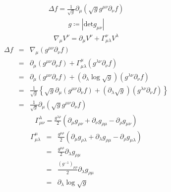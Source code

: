 \documentclass[12pt]{ujarticle}
\begin{document}
\begin{eqnarray}
\Delta f  = \frac{1}{\sqrt{g}}\partial_{\mu}\left(\sqrt{g}g^{\mu\nu}\partial_{\nu}f\right)
\end{eqnarray}
\begin{eqnarray}
g \coloneqq \left|\mathrm{det}g_{\mu\nu}\right|
\end{eqnarray}
\begin{eqnarray}
\nabla_{\mu}V^{\nu} = \partial_{\mu}V^{\nu} + \Gamma^{\nu}_{\mu\lambda}V^{\lambda}
\end{eqnarray}
\begin{eqnarray}
\Delta f &=& \nabla_{\mu}\left(g^{\mu\nu}\partial_{\nu}f\right) \\
&=& \partial_{\mu}\left(g^{\mu\nu}\partial_{\nu}f\right) + \Gamma^{\mu}_{\mu\lambda}\left(g^{\lambda\nu}\partial_{\nu}f\right) \\
&=& \partial_{\mu}\left(g^{\mu\nu}\partial_{\nu}f\right) + \left(\partial_{\lambda}\log\sqrt{g}\right)\left(g^{\lambda\nu}\partial_{\nu}f\right) \\
&=& \frac{1}{\sqrt{g}}\left\{\sqrt{g}\partial_{\mu}\left(g^{\mu\nu}\partial_{\nu}f\right) + \left(\partial_{\lambda}\sqrt{g}\right)\left(g^{\lambda\nu}\partial_{\nu}f\right)\right\} \\
&=& \frac{1}{\sqrt{g}}\partial_{\mu}\left(\sqrt{g}g^{\mu\nu}\partial_{\nu}f\right)
\end{eqnarray}
\begin{eqnarray}
\Gamma^{\lambda}_{\mu\nu} = \frac{g^{\lambda\rho}}{2}\left(\partial_{\mu}g_{\rho\nu} + \partial_{\nu}g_{\rho\mu} - \partial_{\rho}g_{\mu\nu}\right)
\end{eqnarray}
\begin{eqnarray}
\Gamma^{\mu}_{\mu\lambda} &=& \frac{g^{\mu\rho}}{2}\left(\partial_{\mu}g_{\rho\lambda} + \partial_{\lambda}g_{\rho\mu} - \partial_{\rho}g_{\mu\lambda}\right) \\
&=& \frac{g^{\mu\rho}}{2}\partial_{\lambda}g_{\rho\mu} \\
&=& \frac{\left(g^{-1}\right)_{\mu\rho}}{2}\partial_{\lambda}g_{\rho\mu} \\
&=& \partial_{\lambda}\log\sqrt{g}
\end{eqnarray}
\end{document}
